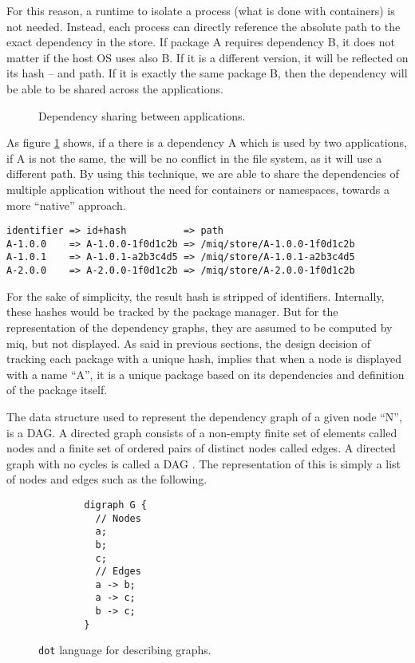For this reason, a runtime to isolate a process (what is
done with containers) is not needed. Instead, each process
can directly reference the absolute path to the exact
dependency in the store. If package A requires dependency B,
it does not matter if the host \ac{OS} uses also B. If it is
a different version, it will be reflected on its hash -- and
path. If it is exactly the same package B, then the
dependency will be able to be shared across the applications.

\begin{figure}[hbtp]
    \centerfloat
    
    \caption{Dependency sharing between applications.}
    \label{fig:dep_share}
\end{figure}

As figure \ref{fig:dep_share} shows, if a there is a
dependency A which is used by two applications, if A is not
the same, the will be no conflict in the file system, as it
will use a different path. By using this technique, we are
able to share the dependencies of multiple application
without the need for containers or namespaces, towards a
more ``native'' approach.

\begin{verbatim}
identifier => id+hash          => path
A-1.0.0    => A-1.0.0-1f0d1c2b => /miq/store/A-1.0.0-1f0d1c2b
A-1.0.1    => A-1.0.1-a2b3c4d5 => /miq/store/A-1.0.1-a2b3c4d5
A-2.0.0    => A-2.0.0-1f0d1c2b => /miq/store/A-2.0.0-1f0d1c2b
\end{verbatim}

For the sake of simplicity, the result hash is stripped of
identifiers. Internally, these hashes would be tracked by
the package manager. But for the representation of the
dependency graphs, they are assumed to be computed by miq,
but not displayed. As said in previous sections, the design
decision of tracking each package with a unique hash,
implies that when a node is displayed with a name ``A'', it
is a unique package based on its dependencies and definition
of the package itself.

The data structure used to represent the dependency graph of
a given node ``N'', is a \acl{DAG}. A directed graph
consists of a non-empty finite set of elements called nodes
and a finite set of ordered pairs of distinct nodes called
edges. A directed graph with no cycles is called a \ac{DAG}
\cite{bang-jensenDigraphs2009} . The representation of this
is simply a list of nodes and edges such as the following.

\begin{figure}[hbtp]
    \centering
    \begin{minipage}[t]{0.5\textwidth}

    \begin{verbatim}
        digraph G {
          // Nodes
          a;
          b;
          c;
          // Edges
          a -> b;
          a -> c;
          b -> c;
        }
    \end{verbatim}
    \end{minipage}
   \caption{\texttt{dot} language for describing graphs.}
   \label{fig:dot_graph}
\end{figure}

